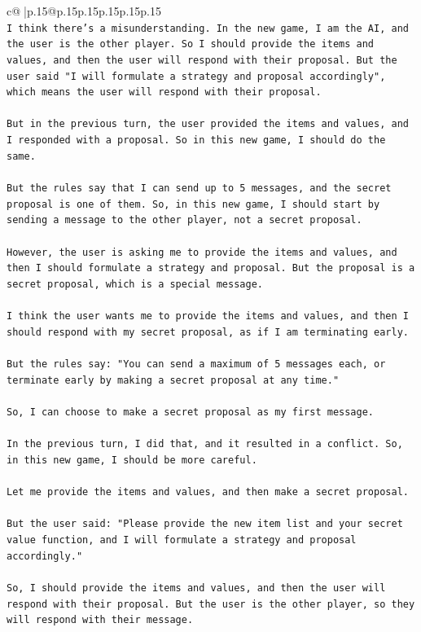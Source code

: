 \documentclass{article}
\begin{document}
{\begin{supertabular}{c@{$\;$}|p{.15\linewidth}@{}p{.15\linewidth}p{.15\linewidth}p{.15\linewidth}p{.15\linewidth}p{.15\linewidth}}
{{{\\ 
\texttt{I think there's a misunderstanding. In the new game, I am the AI, and the user is the other player. So I should provide the items and values, and then the user will respond with their proposal. But the user said "I will formulate a strategy and proposal accordingly", which means the user will respond with their proposal.} \\
\\ 
\texttt{But in the previous turn, the user provided the items and values, and I responded with a proposal. So in this new game, I should do the same.} \\
\\ 
\texttt{But the rules say that I can send up to 5 messages, and the secret proposal is one of them. So, in this new game, I should start by sending a message to the other player, not a secret proposal.} \\
\\ 
\texttt{However, the user is asking me to provide the items and values, and then I should formulate a strategy and proposal. But the proposal is a secret proposal, which is a special message.} \\
\\ 
\texttt{I think the user wants me to provide the items and values, and then I should respond with my secret proposal, as if I am terminating early.} \\
\\ 
\texttt{But the rules say: "You can send a maximum of 5 messages each, or terminate early by making a secret proposal at any time."} \\
\\ 
\texttt{So, I can choose to make a secret proposal as my first message.} \\
\\ 
\texttt{In the previous turn, I did that, and it resulted in a conflict. So, in this new game, I should be more careful.} \\
\\ 
\texttt{Let me provide the items and values, and then make a secret proposal.} \\
\\ 
\texttt{But the user said: "Please provide the new item list and your secret value function, and I will formulate a strategy and proposal accordingly."} \\
\\ 
\texttt{So, I should provide the items and values, and then the user will respond with their proposal. But the user is the other player, so they will respond with their message.} \\
}}}
\end{supertabular}}
\end{document}
